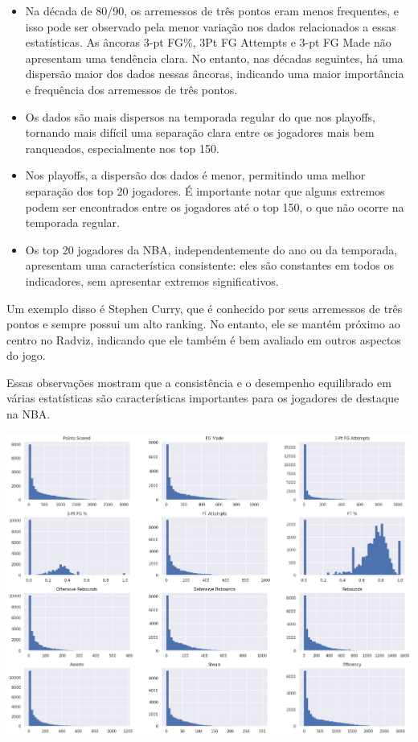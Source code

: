 \documentclass[
]{book}
\begin{document}
\begin{itemize}
\item
  Na década de 80/90, os arremessos de três pontos eram menos frequentes, e isso pode ser observado pela menor variação nos dados relacionados a essas estatísticas. As âncoras 3-pt FG\%, 3Pt FG Attempts e 3-pt FG Made não apresentam uma tendência clara. No entanto, nas décadas seguintes, há uma dispersão maior dos dados nessas âncoras, indicando uma maior importância e frequência dos arremessos de três pontos.
\item
  Os dados são mais dispersos na temporada regular do que nos playoffs, tornando mais difícil uma separação clara entre os jogadores mais bem ranqueados, especialmente nos top 150.
\item
  Nos playoffs, a dispersão dos dados é menor, permitindo uma melhor separação dos top 20 jogadores. É importante notar que alguns extremos podem ser encontrados entre os jogadores até o top 150, o que não ocorre na temporada regular.
\item
  Os top 20 jogadores da NBA, independentemente do ano ou da temporada, apresentam uma característica consistente: eles são constantes em todos os indicadores, sem apresentar extremos significativos.
\end{itemize}

Um exemplo disso é Stephen Curry, que é conhecido por seus arremessos de três pontos e sempre possui um alto ranking. No entanto, ele se mantém próximo ao centro no Radviz, indicando que ele também é bem avaliado em outros aspectos do jogo.

Essas observações mostram que a consistência e o desempenho equilibrado em várias estatísticas são características importantes para os jogadores de destaque na NBA.

\includegraphics{imagens/15.png}
\end{document}
